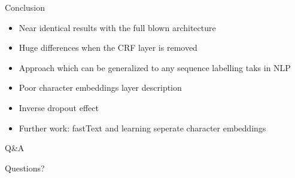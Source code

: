 \documentclass{beamer}
\begin{document}
\begin{frame}{Conclusion}
    \begin{itemize}
        \item{
                Near identical results with the full blown architecture
            }
        \item{
                Huge differences when the CRF layer is removed
            }
        \item{
                Approach which can be generalized to any sequence labelling
                taks in NLP
            }
        \item{
                Poor character embeddings layer description
            }
        \item{
                Inverse dropout effect
            }
        \item{
                Further work: fastText and learning seperate character
                embeddings
            }
    \end{itemize}
\end{frame}

\begin{frame}{Q\&A}
    \begin{center}
    \Huge Questions?
    \end{center}
\end{frame}
\end{document}
